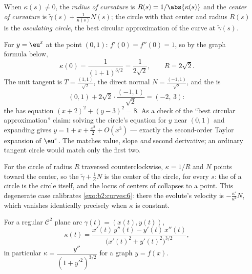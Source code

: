 \begin{definition}\label{def:b2:curves:curvature}
When $\kappa(s) \neq 0$, the \emph{radius of
curvature} is $R(s) =
1/\abs{\kappa(s)}$ and the \emph{center of curvature} is
$\tilde\gamma(s) + \frac{1}{\kappa(s)} N(s)$; the circle with that
center and radius $R(s)$ is the \emph{osculating circle}, the
best circular approximation of the curve at $\tilde\gamma(s)$.
\end{definition}

\begin{example}\label{ex:b2:curves:oscexp}
For $y = \eu^x$ at the point $(0, 1)$: $f'(0) = f''(0) = 1$,
so by the graph formula below,
\[
\kappa(0) = \frac{1}{(1 + 1)^{3/2}} = \frac1{2\sqrt2},
\qquad R = 2\sqrt2 .
\]
The unit tangent is $T = \frac{(1, 1)}{\sqrt2}$, the direct
normal $N = \frac{(-1, 1)}{\sqrt2}$, and the  is
\[
(0, 1) + 2\sqrt2\cdot\frac{(-1, 1)}{\sqrt2} = (-2,\ 3) :
\]
the  has equation $(x + 2)^2 + (y - 3)^2 =
8$. As a check of the ``best circular approximation'' claim:
solving the circle's equation for $y$ near $(0,1)$ and
expanding gives $y = 1 + x + \frac{x^2}2 + O(x^3)$ ---
exactly the second-order Taylor expansion of $\eu^x$. The
 matches value, slope \emph{and} second
derivative; an ordinary tangent circle would match only the
first two.
\end{example}

\begin{example}\label{ex:b2:curves:circleevolute}
For the circle of radius $R$ traversed counterclockwise,
$\kappa = 1/R$ and $N$ points toward the center, so the
 $\tilde\gamma + \frac1\kappa N$ is the
center of the circle, for every $s$: the 
of a circle is the circle itself, and the locus of centers
of  collapses to a point. This degenerate case
calibrates \cref{exo:b2:curves:6}: there the evolute's
velocity is $-\frac{\kappa'}{\kappa^2}N$, which vanishes
identically precisely when $\kappa$ is constant.
\end{example}

\begin{proposition}\label{prop:b2:curves:kappaformula}
For a regular $\mathcal{C}^2$ plane arc $\gamma(t) = (x(t), y(t))$,
\[
\kappa(t)
= \frac{x'(t)\,y''(t) - y'(t)\,x''(t)}
       {\bigl(x'(t)^2 + y'(t)^2\bigr)^{3/2}} ,
\]
in particular $\kappa = \dfrac{y''}{(1 + y'^2)^{3/2}}$ for a graph
$y = f(x)$.
\end{proposition}

